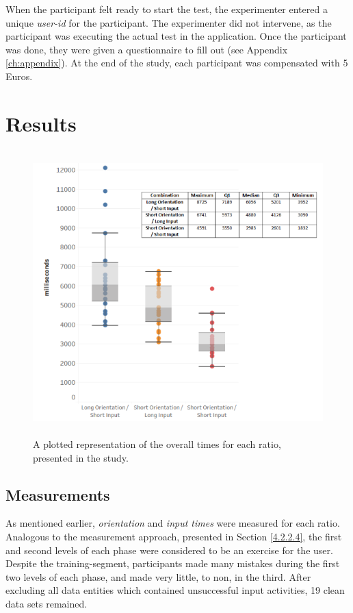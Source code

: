When the participant felt ready to start the test, the experimenter entered a unique \textit{user-id} for the participant. The experimenter did not intervene, as the participant was executing the actual test in the application. Once the participant was done, they were given a questionnaire to fill out (see Appendix \ref{ch:appendix}). At the end of the study, each participant was compensated with 5 Euros.

\section{Results} \label{5.4}

\begin{figure}[t!]
\centering
\includegraphics[width=13cm, height=11cm]{Chapters/graphics/Combinations.png}
\caption{A plotted representation of the overall times for each ratio, presented in the study.}
\label{fig:combination}
\end{figure}

\subsection{Measurements}

 As mentioned earlier, \textit{orientation} and \textit{input times} were measured for each ratio. Analogous to the measurement approach, presented in Section \ref{4.2.2.4}, the first and second levels of each phase were considered to be an exercise for the user. Despite the training-segment, participants made many mistakes during the first two levels of each phase, and made very little, to non, in the third. After excluding all data entities which contained unsuccessful input activities, 19 clean data sets remained. 

